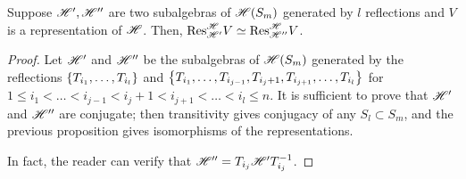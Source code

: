\documentclass{amsart}
\begin{document}
\begin{corollary}
  Suppose $\mathscr{H}',\mathscr{H}''$ are two subalgebras of $\mathscr{H}(S_m)$ generated by $l$ reflections and $V$ is a representation of $\mathscr{H}$.
  Then, $\text{Res}_{\mathscr{H}'}^{\mathscr{H}} V \simeq \text{Res}_{\mathscr{H}''}^{\mathscr{H}} V$.
\end{corollary}
\begin{proof}
  Let $\mathscr{H}'$ and $\mathscr{H}''$ be the subalgebras of $\mathscr{H}(S_m)$ generated by the reflections $\left\{ T_{i_1},\dots,T_{i_l} \right\}$ and $\left\{ T_{i_1},\dots,T_{i_{j-1}},T_{i_j + 1},T_{i_{j+1}},\dots,T_{i_l} \right\}$ for $1 \leq i_1 < \dots < i_{j-1} < i_j + 1 < i_{j+1} < \dots < i_l \leq n$.
  It is sufficient to prove that $\mathscr{H}'$ and $\mathscr{H}''$ are conjugate;
  then transitivity gives conjugacy of any $S_l \subset S_m$, and the previous proposition gives isomorphisms of the representations.
  
  In fact, the reader can verify that $\mathscr{H}'' = T_{i_j}\mathscr{H}'T_{i_j}^{-1}$.
\end{proof}
\end{document}
